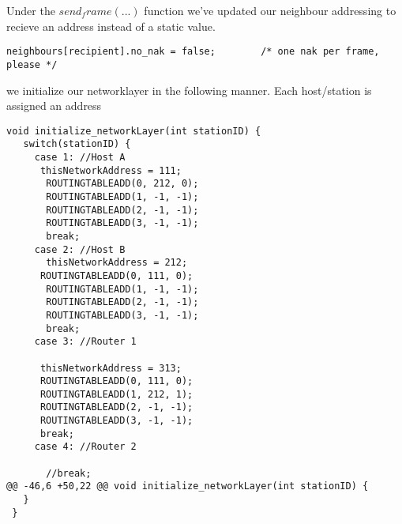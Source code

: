 Under the $send_frame(...)$ function we've updated our neighbour addressing to recieve an address instead of a static value.
\begin{lstlisting}
neighbours[recipient].no_nak = false;        /* one nak per frame, please */
\end{lstlisting}














we initialize our networklayer in the following manner.
Each host/station is assigned an address

\begin{lstlisting}
void initialize_networkLayer(int stationID) {
   switch(stationID) {
     case 1: //Host A
      thisNetworkAddress = 111;
       ROUTINGTABLEADD(0, 212, 0);
       ROUTINGTABLEADD(1, -1, -1);
       ROUTINGTABLEADD(2, -1, -1);
       ROUTINGTABLEADD(3, -1, -1);
       break;
     case 2: //Host B
       thisNetworkAddress = 212;
      ROUTINGTABLEADD(0, 111, 0);
       ROUTINGTABLEADD(1, -1, -1);
       ROUTINGTABLEADD(2, -1, -1);
       ROUTINGTABLEADD(3, -1, -1);
       break;
     case 3: //Router 1

      thisNetworkAddress = 313;
      ROUTINGTABLEADD(0, 111, 0);
      ROUTINGTABLEADD(1, 212, 1);
      ROUTINGTABLEADD(2, -1, -1);
      ROUTINGTABLEADD(3, -1, -1);
      break;
     case 4: //Router 2

       //break;
@@ -46,6 +50,22 @@ void initialize_networkLayer(int stationID) {
   }
 }
\end{lstlisting}



\hfill \break
